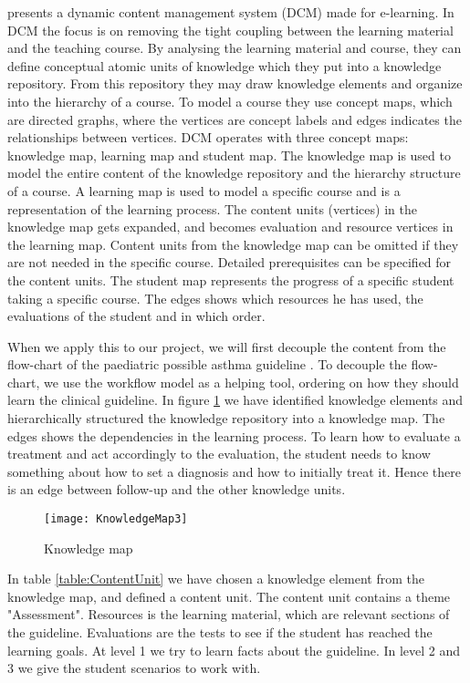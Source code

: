 \textcite{Eide2008} presents a dynamic content management system (DCM) made for e-learning. In DCM the focus is on removing the tight coupling between the learning material and the teaching course. By analysing the learning material and course, they can define conceptual atomic units of knowledge which they put into a knowledge repository. From this repository they may draw knowledge elements and organize into the hierarchy of a course. To model a course they use concept maps, which are directed graphs, where the vertices are concept labels and edges indicates the relationships between vertices. DCM operates with three concept maps: knowledge map, learning map and student map. The knowledge map is used to model the entire content of the knowledge repository and the hierarchy structure of a course. A learning map is used to model a specific course and is a representation of the learning process. The content units (vertices) in the knowledge map gets expanded, and becomes evaluation and resource vertices in the learning map. Content units from the knowledge map can be omitted if they are not needed in the specific course. Detailed prerequisites can be specified for the content units. The student map represents the progress of a specific student taking a specific course. The edges shows which resources he has used, the evaluations of the student and in which order. 


When we apply this to our project, we will first decouple the content from the flow-chart of the paediatric possible asthma guideline \parencite{RepublicofKeny2016}. To decouple the flow-chart, we use the workflow model as a helping tool, ordering on how they should learn the clinical guideline. In figure \ref{fig:KnowledgeMap} we have identified knowledge elements and hierarchically structured the knowledge repository into a knowledge map. The edges shows the dependencies in the learning process. To learn how to evaluate a treatment and act accordingly to the evaluation, the student needs to know something about how to set a diagnosis and how to initially treat it. Hence there is an edge between follow-up and the other knowledge units.

\begin{figure}[h!]
	\caption {Knowledge map}
	\label{fig:KnowledgeMap}
	\texttt{[image: KnowledgeMap3]}
\end{figure}

In table \ref{table:ContentUnit} we have chosen a knowledge element from the knowledge map, and defined a content unit. The content unit contains a theme "Assessment". Resources is the learning material, which are relevant sections of the guideline. Evaluations are the tests to see if the student has reached the learning goals. At level 1 we try to learn facts about the guideline. In level 2 and 3 we give the student scenarios to work with.

